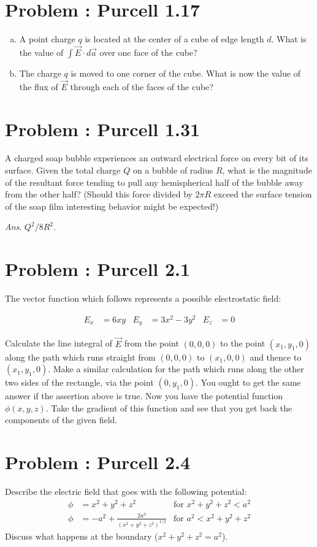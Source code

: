 \documentclass[problems]{esg8022pset}
\begin{document}
\section{Problem \thesection: Purcell 1.17}
  \begin{enumerate}[(a)]
    \item A point charge $q$ is located at the center of a cube of edge length $d$. What is the value of $\int \vec E \cdot d\vec a$ over one face of the cube?
    \item The charge $q$ is moved to one corner of the cube. What is now the value of the flux of $\vec E$ through each of the faces of the cube?
  \end{enumerate}
\section{Problem \thesection: Purcell 1.31}
  A charged soap bubble experiences an outward electrical force on every bit of its surface. Given the total charge $Q$ on a bubble of radius $R$, what is the magnitude of the resultant force tending to pull any hemispherical half of the bubble away from the other half? (Should this force divided by $2\pi R$ exceed the surface tension of the soap film interesting behavior might be expected!)

  \begin{flushright}\emph{Ans}. $Q^2/8R^2$.\end{flushright}
\section{Problem \thesection: Purcell 2.1}
  The vector function which follows represents a possible electrostatic field:

  \begin{align*}
    E_x & = 6xy &
      E_y & = 3x^2 - 3y^2 &
        E_z & = 0
  \end{align*}

  Calculate the line integral of $\vec E$ from the point $(0, 0, 0)$ to the point $(x_1, y_1, 0)$ along the path which runs straight from $(0, 0, 0)$ to $(x_1, 0, 0)$ and thence to $(x_1, y_1, 0)$. Make a similar calculation for the path which runs along the other two sides of the rectangle, via the point $(0, y_1, 0)$. You ought to get the same answer if the assertion above is true. Now you have the potential function $\phi(x, y, z)$. Take the gradient of this function and see that you get back the components of the given field.
\section{Problem \thesection: Purcell 2.4}
  Describe the electric field that goes with the following potential:
  \begin{align*}
    \phi & = x^2 + y^2 + z^2 & \text{for }x^2 + y^2 + z^2 < a^2 \\
    \phi & = -a^2 + \frac{2a^3}{(x^2 + y^2 + z^2)^{1/2}} & \text{for }a^2 < x^2 + y^2 + z^2
  \end{align*}
  Discuss what happens at the boundary ($x^2 + y^2 + z^2 = a^2$).
\end{document}
